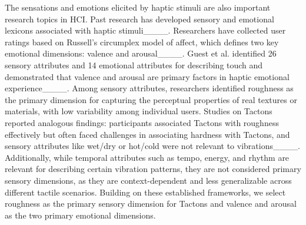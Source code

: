 The sensations and emotions elicited by haptic stimuli are also important research topics in HCI.
Past research has developed sensory and emotional lexicons associated with haptic stimuli____.
Researchers have collected user ratings based on Russell's circumplex model of affect, which defines two key emotional dimensions: valence and arousal____.
Guest et al. identified 26 sensory attributes and 14 emotional attributes for describing touch and demonstrated that valence and arousal are primary factors in haptic emotional experience____.
Among sensory attributes, researchers identified roughness as the primary dimension for capturing the perceptual properties of real textures or materials, with low variability among individual users.
Studies on Tactons reported analogous findings: participants associated Tactons with roughness effectively but often faced challenges in associating hardness with Tactons, and sensory attributes like wet/dry or hot/cold were not relevant to vibrations____.
Additionally, while temporal attributes such as tempo, energy, and rhythm are relevant for describing certain vibration patterns, they are not considered primary sensory dimensions, as they are context-dependent and less generalizable across different tactile scenarios.
Building on these established frameworks, we select roughness as the primary sensory dimension for Tactons and valence and arousal as the two primary emotional dimensions.



